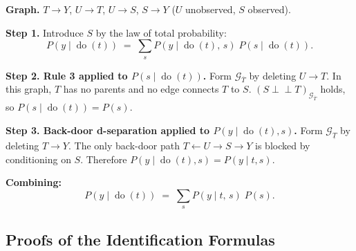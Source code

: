 \documentclass[
  a4paper,
]{book}
\newcommand{\doop}{\operatorname{do}}
\newcommand{\indep}{\perp\!\!\!\perp}
\newcommand{\Gcal}{\mathcal{G}}
\begin{document}
\begin{tcolorbox}[enhanced jigsaw, arc=.35mm, bottomrule=.15mm, bottomtitle=1mm, breakable, colback=white, colbacktitle=quarto-callout-note-color!10!white, colframe=quarto-callout-note-color-frame, coltitle=black, left=2mm, leftrule=.75mm, opacityback=0, opacitybacktitle=0.6, rightrule=.15mm, title={Example: A Two-Rule Derivation --- the Proxy Variable Graph}, titlerule=0mm, toprule=.15mm, toptitle=1mm]

\textbf{Graph.} \(T \to Y\), \(U \to T\), \(U \to S\), \(S \to Y\)
(\(U\) unobserved, \(S\) observed).

\textbf{Step 1.} Introduce \(S\) by the law of total probability:
\[P(y \mid \doop(t)) \;=\; \sum_s P(y \mid \doop(t),\,s)\;P(s \mid \doop(t)).\]

\textbf{Step 2. Rule 3 applied to \(P(s \mid \doop(t))\).} Form
\(\Gcal_{\overline{T}}\) by deleting \(U \to T\). In this graph, \(T\)
has no parents and no edge connects \(T\) to \(S\).
\((S \indep T)_{\Gcal_{\overline{T}}}\) holds, so
\(P(s \mid \doop(t)) = P(s)\).

\textbf{Step 3. Back-door d-separation applied to
\(P(y \mid \doop(t), s)\).} Form \(\Gcal_{\underline{T}}\) by deleting
\(T \to Y\). The only back-door path \(T \leftarrow U \to S \to Y\) is
blocked by conditioning on \(S\). Therefore
\(P(y \mid \doop(t), s) = P(y \mid t, s)\).

\textbf{Combining:}
\[P(y \mid \doop(t)) \;=\; \sum_s P(y \mid t,\,s)\;P(s).\]

\end{tcolorbox}

\subsection{Proofs of the Identification Formulas}\label{sec-proofs}
\end{document}
